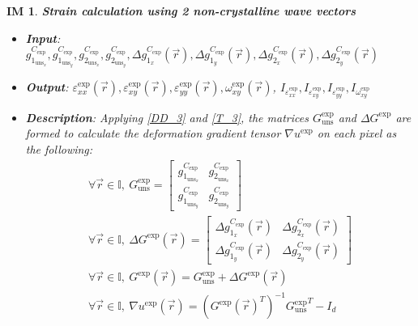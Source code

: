 \documentclass[12pt]{article}
\newtheorem{IM}{IM}
\begin{document}
\begin{IM}
\label{IM_5}
\noindent\colorbox{shadecolorIM}{\normalfont \textbf{Strain calculation using 2 
non-crystalline wave vectors}}
\normalfont
\begin{itemize}
\item \textbf{Input}: $g_{1_{{\text{uns}}_x}}^{C_{\text{exp}}}, 
g_{1_{{\text{uns}}_y}}^{C_{\text{exp}}},g_{2_{{\text{uns}}_x}}^{C_{\text{exp}}}, 
g_{2_{{\text{uns}}_y}}^{C_{\text{exp}}}, \Delta 
g_{1_{x}}^{C_{\text{exp}}}(\vec{r}), \Delta 
g_{1_{y}}^{C_{\text{exp}}}(\vec{r}),\Delta 
g_{2_{x}}^{C_{\text{exp}}}(\vec{r}),\Delta g_{2_{y}}^{C_{\text{exp}}}(\vec{r})$
\item \textbf{Output}: 
$\varepsilon_{\mathit{xx}}^{\text{exp}}(\vec{r}),\varepsilon_{\mathit{xy}}^{\text{exp}}(\vec{r}),\varepsilon_{\mathit{yy}}^{\text{exp}}(\vec{r}),\omega_{\mathit{xy}}^{\text{exp}}(\vec{r})$, 
$I_{\varepsilon_{\mathit{xx}}^{\text{exp}}},I_{\varepsilon_{\mathit{xy}}^{\text{exp}}},I_{\varepsilon_{\mathit{yy}}^{\text{exp}}},I_{\omega_{\mathit{xy}}^{\text{exp}}}$
\item \textbf{Description}: Applying \cref{DD_3} and \cref{T_3}, the matrices 
$G_{\text{uns}}^{\text{exp}}$ and $\Delta G^{\text{exp}}$ are formed to 
calculate the deformation gradient tensor $\nabla u^{\text{exp}}$ on each pixel 
as the following:
\begin{equation}
\begin{gathered}
\forall \vec{r} \in \mathbb{I}, \ G_{\text{uns}}^{\text{exp}} =
	\begin{bmatrix}
	g_{1_{{\text{uns}}_x}}^{C_{\text{exp}}} & 
g_{2_{{\text{uns}}_x}}^{C_{\text{exp}}} \\
	g_{1_{{\text{uns}}_y}}^{C_{\text{exp}}} & 
g_{2_{{\text{uns}}_y}}^{C_{\text{exp}}} 
	\end{bmatrix} \\
\forall \vec{r} \in \mathbb{I}, \	\Delta G^{\text{exp}}(\vec{r})=
	\begin{bmatrix}
	\Delta g_{1_{x}}^{C_{\text{exp}}}(\vec{r}) & \Delta 
g_{2_{x}}^{C_{\text{exp}}}(\vec{r}) \\
	\Delta g_{1_{y}}^{C_{\text{exp}}}(\vec{r}) & \Delta 
g_{2_{y}}^{C_{\text{exp}}}(\vec{r})
	\end{bmatrix} \\
	\forall \vec{r} \in \mathbb{I}, \	G^{\text{exp}}(\vec{r})= 
G_{\text{uns}}^{\text{exp}} + \Delta G^{\text{exp}}(\vec{r})\\
\forall \vec{r} \in \mathbb{I}, \	\nabla u^{\text{exp}}(\vec{r}) = 
({{G^{\text{exp}}}(\vec{r})}^{T})^{-1}{{G_{\text{uns}}^{\text{exp}}}}^{T}-I_{d}

\end{gathered}
\end{equation}
\end{itemize}
\end{IM}
\end{document}

